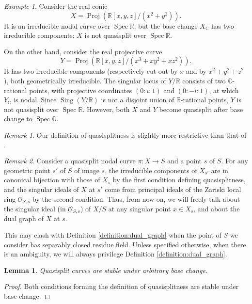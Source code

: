 \documentclass[a4paper,10pt,twoside]{article}
\newcommand{\C}{\mathbb{C}}
\renewcommand{\O}{\mathcal{O}}
\DeclareMathOperator{\spec}{Spec}
\DeclareMathOperator{\sing}{Sing}
\newtheorem{lem}[thm]{Lemma}
\theoremstyle{definition}
\theoremstyle{remark}
\newtheorem{rem}{Remark}[thm]
\newtheorem{ex}[thm]{Example}
\begin{document}
\begin{ex}
Consider the real conic
\[
X=\operatorname{Proj}(\mathbb R[x,y,z]/(x^2+y^2)).
\]
It is an irreducible nodal curve over $\spec \mathbb R$, but the base change $X_{\mathbb C}$ has two irreducible components: $X$ is not quasisplit over $\spec \mathbb R$.

On the other hand, consider the real projective curve
\[
Y=\operatorname{Proj}(\mathbb R[x,y,z]/(x^3+xy^2+xz^2)).
\]
It has two irreducible components (respectively cut out by $x$ and by $x^2+y^2+z^2$), both geometrically irreducible. The singular locus of $Y/\mathbb R$ consists of two $\C$-rational points, with projective coordinates $(0:i:1)$ and $(0:-i:1)$, at which $Y_{\mathbb C}$ is nodal. Since $\sing(Y/\mathbb R)$ is not a disjoint union of $\mathbb R$-rational points, $Y$ is not quasisplit over $\spec \mathbb R$. However, both $X$ and $Y$ become quasisplit after base change to $\spec\C$.
\end{ex}


\begin{rem}
Our definition of quasisplitness is slightly more restrictive than that of \cite{HolmesUniversalJacobian}.
\end{rem}

\begin{rem}\label{remark:Zariski_dual_graphs_of_QS_curves}
Consider a quasisplit nodal curve $\pi\colon X \to S$ and a point $s$ of $S$. For any geometric point $s'$ of $S$ of image $s$, the irreducible components of $X_{s'}$ are in canonical bijection with those of $X_s$ by the first condition defining quasisplitness, and the singular ideals of $X$ at $s'$ come from principal ideals of the Zariski local ring $\O_{S,s}$ by the second condition. Thus, from now on, we will freely talk about the singular ideal (in $\O_{S,s}$) of $X/S$ at any singular point $x\in X_s$, and about the dual graph of $X$ at $s$.

This may clash with Definition \ref{definition:dual_graph} when the point of $S$ we consider has separably closed residue field. Unless specified otherwise, when there is an ambiguity, we will always privilege Definition \ref{definition:dual_graph}.
\end{rem}

\begin{lem}
Quasisplit curves are stable under arbitrary base change.
\end{lem}

\begin{proof}
Both conditions forming the definition of quasisplitness are stable under base change.
\end{proof}
\end{document}
